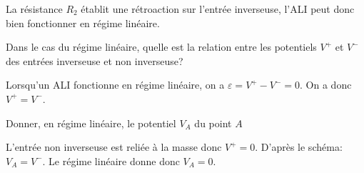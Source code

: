 \begin{corrige}
  La résistance \(R_{2}\) établit une rétroaction sur l’entrée inverseuse, l’ALI peut donc bien fonctionner en régime linéaire.
\end{corrige}




\begin{enonce}
Dans le cas du régime linéaire, quelle est la relation entre les potentiels \(V^{+}\) et \(V^{-}\) des entrées inverseuse et non inverseuse?\minusMedskip\par
\end{enonce}


\begin{corrige}
  Lorsqu’un ALI fonctionne en régime linéaire, on a \(\varepsilon = V^{+} - V^{-} = 0\). On a donc \(V^{+} = V^{-}\).
\end{corrige}




\begin{enonce}
  Donner, en régime linéaire, le potentiel \(V_{A}\) du point \(A\)
\end{enonce}


\begin{corrige}
  L’entrée non inverseuse est reliée à la masse donc \(V^{+} = 0\). D’après le schéma: \(V_{A} = V^{-}\). Le régime linéaire donne donc \(V_{A} = 0\).
\end{corrige}


\finEntrainement









